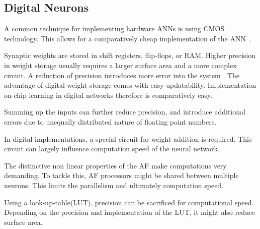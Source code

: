 \documentclass[conference]{IEEEtran}
\begin{document}
    \subsection{Digital Neurons}

    A common technique for implementing hardware ANNs is using CMOS technology.
    This allows for a comparatively cheap implementation of the ANN~\cite{misra2010artificial}.

    Synaptic weights are stored in shift registers, flip-flops, or RAM\@.
    Higher precision in weight storage usually requires a larger surface area and a more complex circuit.
    A reduction of precision introduces more error into the system \cite{Nichols02feasibilityof}.
    The advantage of digital weight storage comes with easy updatability.
    Implementation on-chip learning in digital networks therefore is comparatively easy.

    Summing up the inputs can further reduce precision, and introduce additional errors due to unequally distributed nature of floating point numbers.

    In digital implementations, a special circuit for weight addition is required.
    This circuit can largely influence computation speed of the neural network.

    The distinctive non linear properties of the AF make computations very demanding.
    To tackle this, AF processors might be shared between multiple neurons.
    This limits the parallelism and ultimately computation speed.


    Using a look-up-table(LUT), precision can be sacrificed for computational speed.
    Depending on the precision and implementation of the LUT, it might also reduce surface area.



\end{document}
